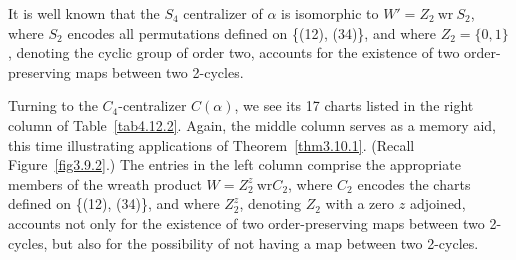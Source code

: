 \documentclass{surv-l}
\numberwithin{equation}{section}
\numberwithin{table}{section}
\numberwithin{figure}{section}
\theoremstyle{definition}
\begin{document}
It is well known that the $S_{4}$ centralizer of $\alpha$ is
isomorphic to $W'=Z_{2}\  \mathrm{wr} \ S_{2}$, where $S_{2}$
encodes all permutations defined on \{(12), (34)\}, and where
$Z_{2}=\{0,1\}$, denoting the cyclic group of order two, accounts
for the existence of two order-preserving maps between two
2-cycles.

Turning to the $C_{4}$-centralizer $C(\alpha)$, we see its 17
charts listed in the right column of Table~\ref{tab4.12.2}. Again,
the middle column serves as a memory aid, this time illustrating
applications of Theorem~\ref{thm3.10.1}. (Recall
Figure~\ref{fig3.9.2}.) The entries in the left column comprise
the appropriate members of the wreath product $W=Z_{2}^{z}\
\mathrm{wr}  C_{2}$, where $C_{2}$ encodes the charts defined on
\{(12), (34)\}, and where $Z_{2}^{z}$, denoting $Z_{2}$ with a
zero $z$ adjoined, accounts not only for the existence of two
order-preserving maps between two 2-cycles, but also for the
possibility of not having a map between two 2-cycles.
\end{document}
